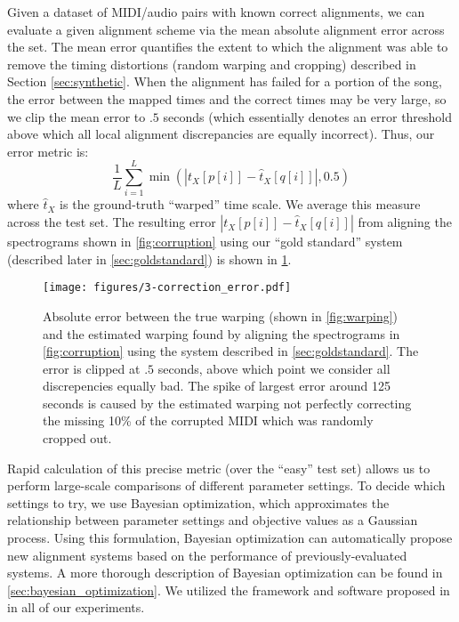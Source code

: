 Given a dataset of MIDI/audio pairs with known correct alignments, we can evaluate a given alignment scheme via the mean absolute alignment error across the set.
The mean error quantifies the extent to which the alignment was able to remove the timing distortions (random warping and cropping) described in Section \ref{sec:synthetic}.
When the alignment has failed for a portion of the song, the error between the mapped times and the correct times may be very large, so we clip the mean error to $.5$ seconds (which essentially denotes an error threshold above which all local alignment discrepancies are equally incorrect).  Thus, our error metric is:
$$
\frac{1}{L}\sum_{i = 1}^{L} \min(|t_X[p[i]] - \hat{t}_X[q[i]]|, 0.5)
$$
where $\hat{t}_X$ is the ground-truth ``warped'' time scale.  We average this measure across the test set.
The resulting error $|t_X[p[i]] - \hat{t}_X[q[i]]|$ from aligning the spectrograms shown in \cref{fig:corruption} using our ``gold standard'' system (described later in \cref{sec:goldstandard}) is shown in \cref{fig:correction_error}.

\begin{figure}
  \centering
  \texttt{[image: figures/3-correction\_error.pdf]}
  \caption[Absolute error from correcting synthetic warping]{Absolute error between the true warping (shown in \cref{fig:warping}) and the estimated warping found by aligning the spectrograms in \cref{fig:corruption} using the system described in \cref{sec:goldstandard}.
The error is clipped at $.5$ seconds, above which point we consider all discrepencies equally bad.
The spike of largest error around 125 seconds is caused by the estimated warping not perfectly correcting the missing 10\% of the corrupted MIDI which was randomly cropped out.}
  \label{fig:correction_error}
\end{figure}

Rapid calculation of this precise metric (over the ``easy'' test set) allows us to perform large-scale comparisons of different parameter settings.
To decide which settings to try, we use Bayesian optimization, which approximates the relationship between parameter settings and objective values as a Gaussian process.
Using this formulation, Bayesian optimization can automatically propose new alignment systems based on the performance of previously-evaluated systems.
A more thorough description of Bayesian optimization can be found in \ref{sec:bayesian_optimization}.
We utilized the framework and software proposed in \cite{snoek2012practical} in all of our experiments.

